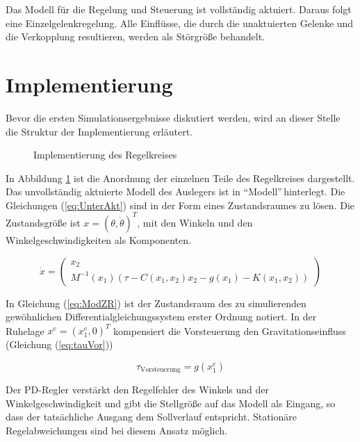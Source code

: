 Das Modell für die Regelung und Steuerung ist vollständig aktuiert. Daraus folgt eine Einzelgelenkregelung. Alle Einflüsse, die durch die unaktuierten Gelenke und die Verkopplung resultieren, werden als Störgröße behandelt.

\section*{Implementierung} 

Bevor die ersten Simulationsergebnisse diskutiert werden, wird an dieser Stelle die Struktur der Implementierung erläutert.

\begin{figure}[h]
	\centering
	
	\caption{Implementierung des Regelkreises}
	\label{fig:Implementierung}
\end{figure}

In Abbildung \ref{fig:Implementierung} ist die Anordnung der einzelnen Teile des Regelkreises dargestellt. Das unvollständig aktuierte Modell des Auslegers ist in \textquotedblleft Modell\textquotedblright \,hinterlegt. Die Gleichungen (\ref{eq:UnterAkt}) sind in der Form eines Zustandsraumes zu lösen. Die Zustandsgröße ist $x=(\theta,\dot{\theta})^T$, mit den Winkeln und den Winkelgeschwindigkeiten als Komponenten.

\begin{equation} \label{eq:ModZR}
\dot{x}	=	\begin{pmatrix}
				x_2 \\
				M^{-1}(x_{1})(\tau - C(x_1,x_2)x_2 - g(x_1) - K(x_1,x_2))
			\end{pmatrix}
\end{equation}

In Gleichung (\ref{eq:ModZR}) ist der Zustandsraum des zu simulierenden gewöhnlichen Differentialgleichungssystem erster Ordnung notiert. In der Ruhelage $x^e=(x_1^e,0)^T$ kompensiert die Vorsteuerung den Gravitationseinfluss (Gleichung (\ref{eq:tauVor})) 

\begin{equation} \label{eq:tauVor}
\tau_{\mathrm{Vorsteuerung}} = g(x_1^e)
\end{equation}

Der PD-Regler verstärkt den Regelfehler des Winkels und der Winkelgeschwindigkeit und gibt die Stellgröße auf das Modell als Eingang, so dass der tatsächliche Ausgang dem Sollverlauf entspricht. Stationäre Regelabweichungen sind bei diesem Ansatz möglich.

